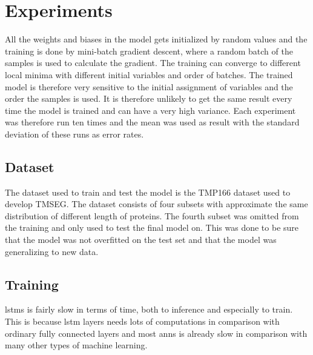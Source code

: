 \section{Experiments}
	

	


All the weights and biases in the model gets initialized by random values and the training
is done by mini-batch gradient descent, where a random batch of the samples is used to 
calculate the gradient. The training can converge to different local minima with 
different initial variables and order of batches.
The trained model is therefore very sensitive to the initial assignment of 
variables and the order the samples is used. It is therefore unlikely to get the same 
result every time the model is trained and can have a very high variance. 
Each experiment was therefore run ten times and the mean was used as result with 
the standard deviation of these runs as error rates.


\subsection{Dataset}
The dataset used to train and test the model is the TMP166\cite{tmseg} dataset used to 
develop TMSEG. The dataset consists of four subsets with approximate the same distribution 
of different length of proteins. The fourth subset was omitted from the training and only 
used to test the final model on. This was done to be sure that the model was not overfitted
on the test set and that the model was generalizing to new data. 

\subsection{Training}
\glspl{lstm} is fairly slow in terms of time, both to inference and especially to train.
This is because \gls{lstm} layers needs lots of computations in comparison with ordinary 
fully connected layers and most \glspl{ann} is already slow in comparison with many 
other types of machine learning.

